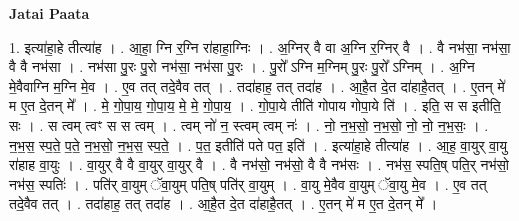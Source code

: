 \documentclass[17pt]{extarticle}
\begin{document}
\textbf{Jatai Paata} \newline

1. इत्या॑हा॒हे तीत्या॑ह । . आ॒हा॒ ग्नि र॒ग्नि रा॑हाहा॒ग्निः । . अ॒ग्निर् वै वा अ॒ग्नि र॒ग्निर् वै । . वै नभ॑सा॒ नभ॑सा॒ वै वै नभ॑सा । . नभ॑सा पु॒रः पु॒रो नभ॑सा॒ नभ॑सा पु॒रः । . पु॒रो᳚ ऽग्नि म॒ग्निम् पु॒रः पु॒रो᳚ ऽग्निम् । . अ॒ग्नि मे॒वैवाग्नि म॒ग्नि मे॒व । . ए॒व तत् तदे॒वैव तत् । . तदा॑हाह॒ तत् तदा॑ह । . आ॒है॒त दे॒त दा॑हाहै॒तत् । . ए॒तन् मे॑ म ए॒त दे॒तन् मे᳚ । . मे॒ गो॒पा॒य॒ गो॒पा॒य॒ मे॒ मे॒ गो॒पा॒य॒ । . गो॒पा॒ये तीति॑ गोपाय गोपा॒ये ति॑ । . इति॒ स स इतीति॒ सः । . स त्वम् त्वꣳ स स त्वम् । . त्वम् नो॑ न॒ स्त्वम् त्वम् नः॑ । . नो॒ न॒भ॒सो॒ न॒भ॒सो॒ नो॒ नो॒ न॒भ॒सः॒ । . न॒भ॒स॒ स्प॒ते॒ प॒ते॒ न॒भ॒सो॒ न॒भ॒स॒ स्प॒ते॒ । . प॒त॒ इतीति॑ पते पत॒ इति॑ । . इत्या॑हा॒हे तीत्या॑ह । . आ॒ह॒ वा॒युर् वा॒यु रा॑हाह वा॒युः । . वा॒युर् वै वै वा॒युर् वा॒युर् वै । . वै नभ॑सो॒ नभ॑सो॒ वै वै नभ॑सः । . नभ॑स॒ स्पति॒ष् पति॒र् नभ॑सो॒ नभ॑स॒ स्पतिः॑ । . पति॑र् वा॒युम् ॅवा॒युम् पति॒ष् पति॑र् वा॒युम् । . वा॒यु मे॒वैव वा॒युम् ॅवा॒यु मे॒व । . ए॒व तत् तदे॒वैव तत् । . तदा॑हाह॒ तत् तदा॑ह । . आ॒है॒त दे॒त दा॑हाहै॒तत् । . ए॒तन् मे॑ म ए॒त दे॒तन् मे᳚ । \newline
\end{document}
